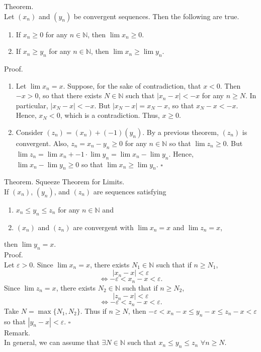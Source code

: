 \documentclass[twocolumn]{article}
\newcommand{\qed}{$\square$}
\newcommand{\br}{\vspace{\baselineskip}}
\let\eps\varepsilon
\newcommand{\naturals}{\mathbb{N}}
\begin{document}
Theorem. \\
Let $(x_n)$ and $(y_n)$ be convergent sequences. Then the following are true.
\begin{enumerate}
	\item
	If $x_n \geq 0$ for any $n \in \naturals$, then $\lim x_n \geq 0$.
	\item
	If $x_n \geq y_n$ for any $n \in \naturals$, then $\lim x_n \geq \lim y_n$.
\end{enumerate}
Proof.
\begin{enumerate}
	\item
	Let $\lim x_n = x$. Suppose, for the sake of contradiction, that $x < 0$. Then $-x > 0$, so that there exists $N \in \naturals$ such that $|x_n - x| < -x$ for any $n \geq N$. In particular, $|x_N - x| < -x$. But $|x_N - x| = x_N - x$, so that $x_N - x < -x$. Hence, $x_N < 0$, which is a contradiction. Thus, $x \geq 0$.
	\item
	Consider $(z_n) = (x_n) + (-1)(y_n)$. By a previous theorem, $(z_n)$ is convergent. Also, $z_n = x_n - y_n \geq 0$ for any $n \in \naturals$ so that $\lim z_n \geq 0$. But $\lim z_n = \lim x_n + -1 \cdot \lim y_n = \lim x_n - \lim y_n$. Hence, $\lim x_n - \lim y_n \geq 0$ so that $\lim x_n \geq \lim y_n$. \qed
\end{enumerate} \br

Theorem. Squeeze Theorem for Limits. \\
If $(x_n)$, $(y_n)$, and $(z_n)$ are sequences satisfying
\begin{enumerate}
	\item
	$x_n \leq y_n \leq z_n$ for any $n \in \naturals$ and
	\item
	$(x_n)$ and $(z_n)$ are convergent with $\lim x_n = x$ and $\lim z_n = x$,
\end{enumerate}
then $\lim y_n = x$. \\
Proof. \\
Let $\eps > 0$. Since $\lim x_n = x$, there exists $N_1 \in \naturals$ such that if $n \geq N_1$,
$$|x_n - x| < \eps$$
$$\Leftrightarrow -\eps < x_n - x < \eps \text{.}$$
Since $\lim z_n = x$, there exists $N_2 \in \naturals$ such that if $n \geq N_2$,
$$|z_n - x| < \eps$$
$$\Leftrightarrow -\eps < z_n - x < \eps \text{.}$$
Take $N = \max \{ N_1, N_2 \}$. Thus if $n \geq N$, then $-\eps < x_n - x \leq y_n - x \leq z_n - x < \eps$ so that $|y_n - x| < \eps$. \qed \\

Remark. \\
In general, we can assume that $\exists N \in \naturals$ such that $x_n \leq y_n \leq z_n$ $\forall n \geq N$. \\
\end{document}
